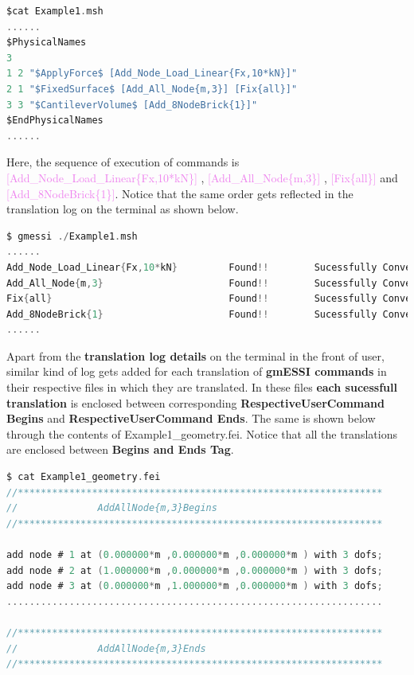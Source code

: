 \documentclass[11pt]{article}
\begin{document}
\begin{lstlisting}[language=C]
$cat Example1.msh
......
$PhysicalNames
3
1 2 "$ApplyForce$ [Add_Node_Load_Linear{Fx,10*kN}]"
2 1 "$FixedSurface$ [Add_All_Node{m,3}] [Fix{all}]"
3 3 "$CantileverVolume$ [Add_8NodeBrick{1}]"
$EndPhysicalNames
......
\end{lstlisting}

Here,     the     sequence     of     execution     of     commands     is
\textcolor{violet}{[Add\_Node\_Load\_Linear\{Fx,10*kN\}]}                ,
\textcolor{violet}{[Add\_All\_Node\{m,3\}]}                              ,
\textcolor{violet}{[Fix\{all\}]}                                       and
\textcolor{violet}{[Add\_8NodeBrick\{1\}]}.  Notice  that  the  same order
gets reflected in the translation log on the terminal as shown below.

\begin{lstlisting}[language=C,backgroundcolor=\color{grayish}]
$ gmessi ./Example1.msh
......
Add_Node_Load_Linear{Fx,10*kN}         Found!!        Sucessfully Converted
Add_All_Node{m,3}                      Found!!        Sucessfully Converted
Fix{all}                               Found!!        Sucessfully Converted
Add_8NodeBrick{1}                      Found!!        Sucessfully Converted
......
\end{lstlisting}

Apart from the \textbf{translation log details} on the terminal in the front of user, similar kind of log gets added for each translation of \textbf{gmESSI commands} in their respective files in which they are translated.    
In these files \textbf{each sucessfull translation} is enclosed between corresponding \textbf{RespectiveUserCommand Begins} and \textbf{RespectiveUserCommand Ends}. The same is shown below through the contents of Example1\_geometry.fei. Notice that all the translations are enclosed between \textbf{Begins and Ends Tag}.   

\begin{lstlisting}[language=C]
$ cat Example1_geometry.fei
//****************************************************************
//              AddAllNode{m,3}Begins
//****************************************************************

add node # 1 at (0.000000*m ,0.000000*m ,0.000000*m ) with 3 dofs;         
add node # 2 at (1.000000*m ,0.000000*m ,0.000000*m ) with 3 dofs;         
add node # 3 at (0.000000*m ,1.000000*m ,0.000000*m ) with 3 dofs;                     
..................................................................

//****************************************************************
//              AddAllNode{m,3}Ends
//**************************************************************** 
\end{lstlisting}
\end{document}
